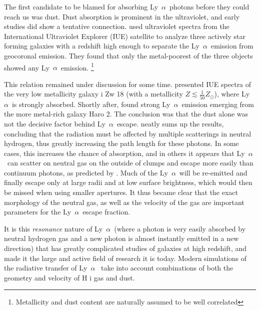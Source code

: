 \documentclass[a4wide,12pt]{book}
\newcommand{\lya}{Ly~${\alpha}$}
\begin{document}
{%
The first candidate to be blamed for absorbing \lya\ photons before they could reach us was dust. Dust absorption is prominent in the ultraviolet, and early studies did show a tentative connection. \citet{meier-terlevich1981} used ultraviolet spectra from the International Ultraviolet Explorer (IUE) satellite to analyze three actively star forming galaxies with a redshift high enough to separate the \lya\ emission from geocoronal emission. They found that only the metal-poorest of the three objects showed any \lya\ emission. \footnote{Metallicity and dust content are naturally assumed to be well correlated}

This relation remained under discussion for some time. \citet{kunth-1994} presented IUE spectra of the very low metallicity galaxy {\sc i} Zw 18 (with a metallicity $Z \lesssim \frac{1}{50} Z_{\odot}$), where \lya\ is strongly absorbed. Shortly after, \citet{lequeux-1995} found strong \lya\ emission emerging from the more metal-rich galaxy Haro 2. The conclusion was that the dust alone was not the decisive factor behind \lya\ escape. \citet{giavalisco-1996} neatly sums up the results, concluding that the radiation must be affected by multiple scatterings in neutral hydrogen, thus greatly increasing the path length for these photons. In some cases, this increases the chance of absorption, and in others it appears that \lya\ can scatter on neutral gas on the outside of clumps and escape more easily than continuum photons, as predicted by \citet{neufeld1991}. Much of the \lya\ will be re-emitted and finally escape only at large radii and at low surface brightness, which would then be missed when using smaller apertures. It thus became clear that the exact morphology of the neutral gas, as well as the velocity of the gas are important parameters for the \lya\ escape fraction. 

It is this {\em resonance} nature of \lya\ (where a photon is very easily absorbed by neutral hydrogen gas and a new photon is almost instantly emitted in a new direction) that has greatly complicated studies of galaxies at high redshift, and made it the large and active field of research it is today. Modern simulations of the radiative transfer of \lya\ \citep[such as those of][, Duval et al. 2012 (submitted), see also Figure~\ref{Fig:verhamme2006static}]{verhamme-2006,garel-2012} take into account combinations of both the geometry and velocity of H {\sc i} gas and dust. 

}
\end{document}
